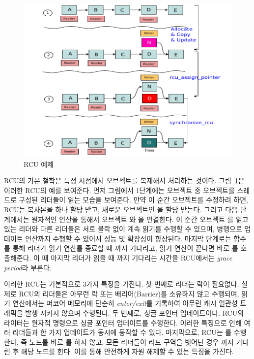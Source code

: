 \begin{figure}[h]
    \centering
    \includegraphics[width=1\textwidth]{fig/rcu/rcu_principle}
    \caption{RCU 예제}
  \label{fig:rcuprinciple}
\end{figure}

RCU의 기본 철학은 특정 시점에서 오브젝트를 복제해서 처리하는 것이다. 
그림~\ref{fig:rcuprinciple}은 이러한 RCU의 예를 보여준다.
먼저 그림에서 1단계에는  오브젝트 중  오브젝트를 스레드로 구성된 
리더들이 읽는 모습을 보여준다.
만약 이 순간  오브젝트를 수정하려 하면, RCU는 복사본을 하나 할당 받고, 새로운 오브젝트인 을 할당 
받는다.
그리고 다음 단계에서는 원자적인 연산을 통해서 오브젝트 와 을 연결한다. 
이 순간 오브젝트 를 읽고 있는 리더와 다른 리더들은 서로 블락 없이 계속 읽기를 수행할 수 있으며, 
병행으로 업데이트 연산까지 수행할 수 있어서 성능 및 확장성이 향상된다.
마지막 단계로는  함수를 통해 리더가 읽기 연산를 종료할 때 까지 기다리고, 읽기 연산이
끝나면 바로 를 호출해준다. 
이 때 마지막 리더가 읽을 때 까지 기다리는 시간을 RCU에서는 \textit{grace period}라 부른다.

이러한 RCU는 기본적으로 3가지 특징을 가진다. 
첫 번째로 리더는 락이 필요없다.
실제로 RCU의 리더들은 아무런 락 또는 배리어(Barrier)를 소유하지 않고 수행되며, 읽기 연산에서는 
퍼코어 메모리에 단순히 \textit{enter/exit}를 기록하여 아무런 캐시 일관성 트래픽을 발생 시키지 않으며 수행된다.
두 번째로, 싱글 포인터 업데이트이다.
RCU의 라이터는 원자적 명령으로 싱글 포인터 업데이트를 수행한다.
이러한 특징으로 인해 여러 리더들과 한 가지 업데이트가 동시에 동작할 수 있다.  
마지막으로, RCU는 를 수행한다.
즉 노드를 바로 를 하지 않고, 모든 리더들이 리드 구역을 벗어난 경우 까지 기다린 후 
해당 노드를 한다.
이를 통해 안전하게 자원 해제할 수 있는 특징을 가진다.

